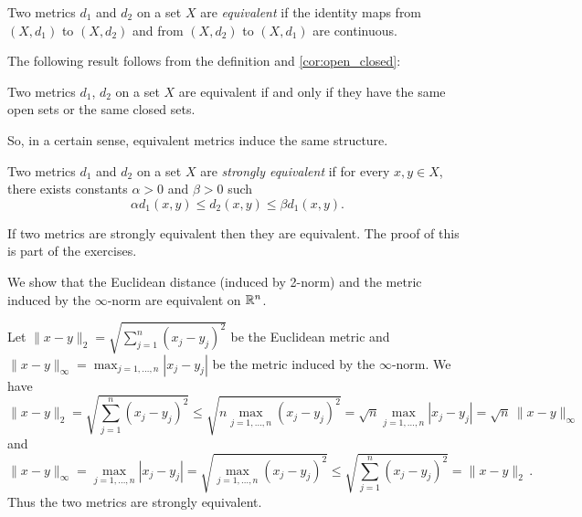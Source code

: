 \documentclass{article}
\begin{document}
\begin{definition}
Two metrics $d_1$ and $d_2$ on a set $X$ are \emph{equivalent} if the identity maps from $(X,d_1)$ to $(X,d_2)$ and from $(X,d_2)$ to $(X,d_1)$ are continuous. 
\end{definition}

The following result follows from the definition and \cref{cor:open_closed}:

\begin{proposition}
Two metrics $d_1$, $d_2$ on a set $X$ are equivalent if and only if they have the same open sets or the same closed sets.
\end{proposition}

So, in a certain sense, equivalent metrics induce the same structure.

\begin{definition}
Two metrics $d_1$ and $d_2$ on a set $X$ are \emph{strongly equivalent} if for every $x,y\in X$, there exists constants $\alpha>0$ and $\beta>0$ such
\begin{equation*}
    \alpha d_1(x,y) \leq d_2(x,y) \leq \beta d_1(x,y).
\end{equation*}
\end{definition}

If two metrics are strongly equivalent then they are equivalent. The proof of this is part of the exercises. 

\begin{example}
We show that the Euclidean distance (induced by 2-norm) and the metric induced by the $\infty$-norm are equivalent on ${\mathbb{R}}^n$. 

\vspace{1em}
Let $\|x-y\|_2=\sqrt{\sum_{j=1}^n (x_j - y_j)^2}$ be the Euclidean metric and $\|x-y\|_\infty= \max_{j=1,\ldots,n} |x_j - y_j|$ be the metric induced by the $\infty$-norm. We have
\begin{equation*}
   \|x-y\|_2 = \sqrt{\sum_{j=1}^n (x_j - y_j)^2} \leq  \sqrt{ n \max_{j=1,\ldots,n} (x_j - y_j)^2}  = \sqrt{n} \max_{j=1,\ldots,n} |x_j - y_j| = \sqrt{n} \, \|x-y\|_\infty
\end{equation*}
and
\begin{equation*}
    \|x-y\|_\infty = \max_{j=1,\ldots,n} |x_j - y_j|  = \sqrt{\max_{j=1,\ldots,n} (x_j - y_j)^2} \leq \sqrt{\sum_{j=1}^n(x_j - y_j)^2}  = \|x-y\|_2  \, .
\end{equation*}
Thus the two metrics are strongly equivalent. 
\end{example}
\end{document}

